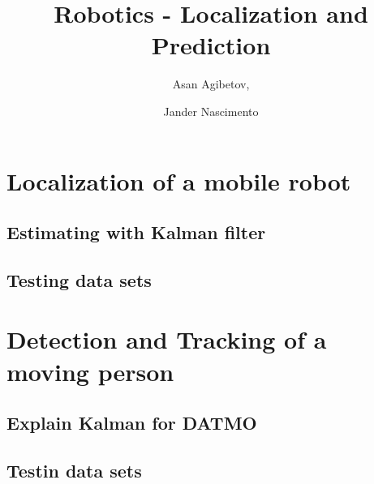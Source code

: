 \documentclass{article}
\begin{document}
\title{Robotics - Localization and Prediction}

\author{Asan Agibetov, 
\and Jander Nascimento}

\maketitle

\section{Localization of a mobile robot}

\subsection{Estimating with Kalman filter}

\subsection{Testing data sets}

\section{Detection and Tracking of a moving person}

\subsection{Explain Kalman for DATMO}

\subsection{Testin data sets}
\end{document}
